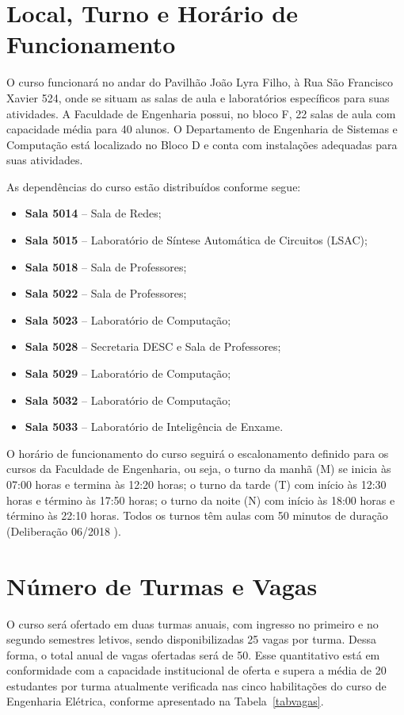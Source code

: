 \section{Local, Turno e Horário de Funcionamento}

O curso funcionará no  andar do Pavilhão João Lyra Filho, à Rua São Francisco Xavier  524, onde se situam as salas de aula e laboratórios específicos para suas atividades. A Faculdade de Engenharia possui, no bloco F, 22 salas de aula com capacidade média
para 40 alunos. O Departamento de Engenharia de Sistemas e Computação está localizado no Bloco D e conta com instalações adequadas para suas atividades.



As dependências do curso estão distribuídos conforme segue:
\begin{itemize}
  \item \textbf{Sala 5014} -- Sala de Redes;
  \item \textbf{Sala 5015} -- Laboratório de Síntese Automática de Circuitos (LSAC);
  \item \textbf{Sala 5018} -- Sala de Professores;
  \item \textbf{Sala 5022} -- Sala de Professores;
  \item \textbf{Sala 5023} -- Laboratório de Computação;
  \item \textbf{Sala 5028} -- Secretaria DESC e Sala de Professores;
  \item \textbf{Sala 5029} -- Laboratório de Computação;
  \item \textbf{Sala 5032} -- Laboratório de Computação;
  \item \textbf{Sala 5033} -- Laboratório de Inteligência de Enxame.
\end{itemize}


O horário de funcionamento do curso seguirá o escalonamento definido para os cursos da Faculdade de Engenharia, ou seja, o turno da manhã (M) se inicia às 07:00 horas e termina às 12:20 horas; o turno da tarde (T) com início às 12:30 horas e término às 17:50 horas; o turno da noite (N) com início às 18:00 horas e término às 22:10 horas. Todos os turnos têm aulas com 50 minutos de duração (Deliberação  06/2018 \cite{uerj2018}).

\section{Número de Turmas e Vagas}
O curso será ofertado em duas turmas anuais, com ingresso no primeiro e no segundo semestres letivos, sendo disponibilizadas 25 vagas por turma. Dessa forma, o total anual de vagas ofertadas será de 50. Esse quantitativo está em conformidade com a capacidade institucional de oferta e supera a média de 20 estudantes por turma atualmente verificada nas cinco habilitações do curso de Engenharia Elétrica, conforme apresentado na Tabela~\ref{tabvagas}.

